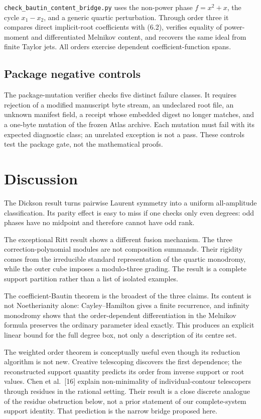 \documentclass[
  11pt,
  a4paper,
]{amsart}
\begin{document}
\texttt{check\_bautin\_content\_bridge.py} uses the non-power phase
\(f=x^2+x\), the cycle \(x_1-x_2\), and a generic quartic perturbation.
Through order three it compares direct implicit-root coefficients with
(6.2), verifies equality of power-moment and differentiated Melnikov
content, and recovers the same ideal from finite Taylor jets. All orders
exercise dependent coefficient-function spans.

\subsection{Package negative controls}

The package-mutation verifier checks five distinct failure classes. It
requires rejection of a modified manuscript byte stream, an undeclared
root file, an unknown manifest field, a receipt whose embedded digest no
longer matches, and a one-byte mutation of the frozen Atlas archive.
Each mutation must fail with its expected diagnostic class; an unrelated
exception is not a pass. These controls test the package gate, not the
mathematical proofs.

\section{Discussion}

The Dickson result turns pairwise Laurent symmetry into a uniform
all-amplitude classification. Its parity effect is easy to miss if one
checks only even degrees: odd phases have no midpoint and therefore
cannot have odd rank.

The exceptional Ritt result shows a different fusion mechanism. The
three correction-polynomial modules are not composition summands. Their
rigidity comes from the irreducible standard representation of the
quartic monodromy, while the outer cube imposes a modulo-three grading.
The result is a complete support partition rather than a list of
isolated examples.

The coefficient-Bautin theorem is the broadest of the three claims. Its
content is not Noetherianity alone: Cayley--Hamilton gives a finite
recurrence, and infinity monodromy shows that the order-dependent
differentiation in the Melnikov formula preserves the ordinary parameter
ideal exactly. This produces an explicit linear bound for the full
degree box, not only a description of its centre set.

The weighted order theorem is conceptually useful even though its
reduction algorithm is not new. Creative telescoping discovers the first
dependence; the reconstructed support quantity predicts its order from
inverse support or root values. Chen et al.~{[}16{]} explain
non-minimality of individual-contour telescopers through residues in the
rational setting. Their result is a close discrete analogue of the
residue obstruction below, not a prior statement of our complete-system
support identity. That prediction is the narrow bridge proposed here.
\end{document}

